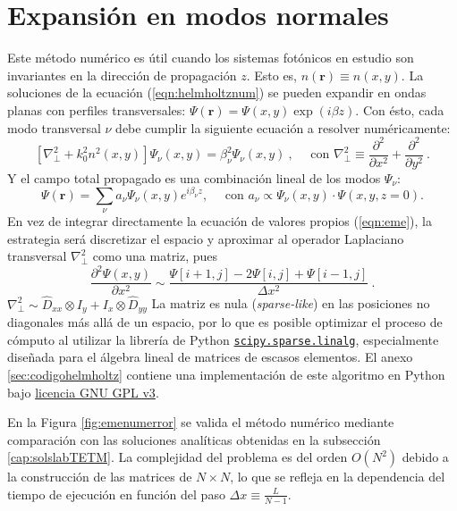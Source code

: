 \section{Expansión en modos normales \label{cap:eme}}
Este método numérico es útil cuando los sistemas fotónicos en estudio son invariantes en la dirección de propagación $z$. Esto es, $n(\textbf{r})\equiv n(x,y)$. La soluciones de la ecuación (\ref{eqn:helmholtznum}) se pueden expandir en ondas planas con perfiles transversales: $\Psi(\textbf{r}) = \Psi(x,y) \exp({i\beta z})$. Con ésto, cada modo transversal $\nu$ debe cumplir la siguiente ecuación a resolver numéricamente:
\begin{equation}
	\left[\nabla_\perp^2 + k_0^2 n^2(x,y)\right]\Psi_\nu(x,y) = \beta_\nu^2\Psi_\nu(x,y) \ , \quad\text{ con } \nabla_\perp^2 \equiv \frac{\partial^2}{\partial x^2} + \frac{\partial^2}{\partial y^2} \ .
	\label{eqn:eme}
\end{equation}
Y el campo total propagado es una combinación lineal de los modos $\Psi_\nu$: 
\begin{equation}
	\Psi(\textbf{r}) = \sum_\nu a_\nu \Psi_\nu(x,y) e^{i\beta_\nu z}, \quad\text{ con } a_\nu \propto \Psi_\nu(x,y) \cdot \Psi(x, y, z=0). \label{eqn:emedin}
\end{equation}
En vez de integrar directamente la ecuación de valores propios (\ref{eqn:eme}), la estrategia será discretizar el espacio y aproximar al operador Laplaciano transversal $\nabla_\perp^2$ como una matriz, pues $$\frac{\partial^2 \Psi(x,y)}{\partial x^2} \sim \frac{\Psi[i+1,j]-2\Psi[i,j]+\Psi[i-1,j]}{\Delta x ^2}  \ .
$$
$\nabla^2_\perp \sim \hat{D}_{xx} \otimes I_y + I_x \otimes \hat{D}_{yy}$
La matriz es nula (\textit{sparse-like}) en las posiciones no diagonales más allá de un espacio, por lo que es posible optimizar el proceso de cómputo al utilizar la librería de Python \href{https://docs.scipy.org/doc/scipy/reference/sparse.linalg.html}{\color{magenta}\texttt{scipy.sparse.linalg}}, especialmente diseñada para el álgebra lineal de matrices de escasos elementos. El anexo \ref{sec:codigohelmholtz} contiene una implementación de este algoritmo en Python bajo \href{https://www.gnu.org/licenses/gpl-3.0.html}{\color{magenta}licencia GNU GPL v3}.

En la Figura \ref{fig:emenumerror} se valida el método numérico mediante comparación con las soluciones analíticas obtenidas en la subsección \ref{cap:solslabTETM}. La complejidad del problema es del orden $O(N^2)$ debido a la construcción de las matrices de $N\times N$, lo que se refleja en la dependencia del tiempo de ejecución en función del paso $\Delta x \equiv \frac{L}{N-1}$.


